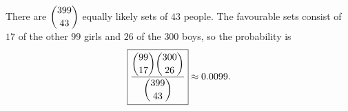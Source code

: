 There are $\dbinom{399}{43}$ equally likely sets of $43$ people. The favourable sets consist of $17$ of the other $99$ girls and $26$ of the $300$ boys, so the probability is
\[
\boxed{\dfrac{\dbinom{99}{17}\dbinom{300}{26}}{\dbinom{399}{43}}}\approx0.0099 .
\]
